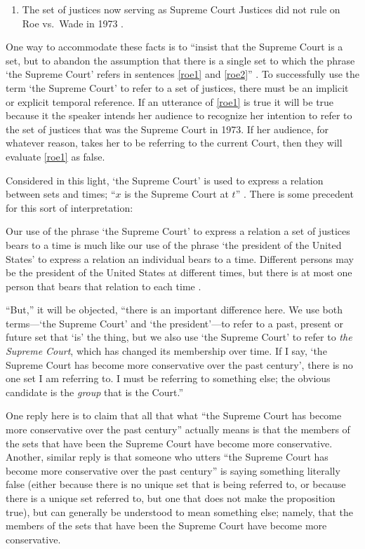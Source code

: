 \documentclass[11pt]{article}
\newenvironment{squote}{%
\begin{spacing}{1}
\begin{list}{}{%
\setlength{\labelwidth}{0pt}%
\rightmargin\leftmargin%
}
\item\relax
}{%
\end{list}%
\end{spacing}
}
\begin{document}
\begin{spacing}{1.5}
\begin{enumerate}[label=(\arabic*)]
  \item The set of justices now serving as Supreme Court Justices did
    not rule on Roe vs.\ Wade in 1973
    \citep[135]{uzquiano2004a}. \label{roe2}
\end{enumerate}

One way to accommodate these facts is to ``insist that the Supreme
Court is a set, but to abandon the assumption that there is a single
set to which the phrase `the Supreme Court' refers in sentences
\ref{roe1} and \ref{roe2}'' \citep[138]{uzquiano2004a}.  To
successfully use the term `the Supreme Court' to refer to a set of
justices, there must be an implicit or explicit temporal reference.
If an utterance of \ref{roe1} is true it will be true because it the
speaker intends her audience to recognize her intention to refer to
the set of justices that was the Supreme Court in 1973.  If her
audience, for whatever reason, takes her to be referring to the
current Court, then they will evaluate \ref{roe1} as false.

Considered in this light, `the Supreme Court' is used to express a
relation between sets and times; ``$x$ is the Supreme Court at $t$''
\citep[140]{uzquiano2004a}.  There is some precedent for this sort of
interpretation:

\begin{squote}
Our use of the phrase `the Supreme Court' to express a relation a set
of justices bears to a time is much like our use of the phrase `the
president of the United States' to express a relation an individual
bears to a time.  Different persons may be the president of the United
States at different times, but there is at most one person that bears
that relation to each time \citep[138]{uzquiano2004a}.
\end{squote}

``But,'' it will be objected, ``there is an important difference here.
We use both terms---`the Supreme Court' and `the president'---to refer
to a past, present or future set that `is' the thing, but we also use
`the Supreme Court' to refer to {\em the Supreme Court}, which has
changed its membership over time.  If I say, `the Supreme Court has
become more conservative over the past century', there is no one set I
am referring to.  I must be referring to something else; the obvious
candidate is the {\em group} that is the Court.''

One reply here is to claim that all that what ``the Supreme Court has
become more conservative over the past century'' actually means is
that the members of the sets that have been the Supreme Court have
become more conservative.  Another, similar reply is that someone who
utters ``the Supreme Court has become more conservative over the past
century'' is saying something literally false (either because there is
no unique set that is being referred to, or because there is a unique
set referred to, but one that does not make the proposition true), but
can generally be understood to mean something else; namely, that the
members of the sets that have been the Supreme Court have become more
conservative.


\end{spacing}
\end{document}
